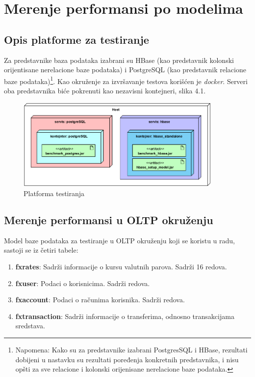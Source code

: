 \documentclass[12pt,oneside]{memoir}
\begin{document}
\chapter{Merenje performansi po modelima}

\section{Opis platforme za testiranje}

Za predstavnike baza podataka izabrani su HBase (kao predstavnik kolonski orijentisane nerelacione baze podataka) i PostgreSQL (kao predstavnik relacione baze podataka)\footnote{Napomena: Kako su za predstavnike izabrani PostgresSQL i HBase, rezultati dobijeni u nastavku su rezultati poređenja konkretnih predstavnika, i nisu opšti za sve relacione i kolonski orijenisane nerelacione baze podataka.}.  Kao okruženje za izvršavanje testova  korišćen je \textit{docker}. Serveri oba predstavnika biće pokrenuti kao nezavisni kontejneri, slika 4.1. 

\begin{figure}[!ht]
  \centering
  \includegraphics[width=0.9\textwidth]{deployment_diagram.png}
  \caption{Platforma testiranja}
  \label{fig:grafikon}
\end{figure}


\section{Merenje performansi u OLTP okruženju}

Model baze podataka za testiranje u OLTP okruženju koji se koristu u radu, sastoji se iz četiri tabele:


\begin{enumerate}
\item[\textbullet] \textbf{fxrates}: {
	Sadrži informacije o kursu valutnih parova. Sadrži 16 redova.
}
\item[\textbullet] \textbf{fxuser}:{
	Podaci o korisnicima. Sadrži   redova.
}
\item[\textbullet] \textbf{fxaccount}:{
	Podaci o računima korisnika. Sadrži   redova.
}
\item[\textbullet] \textbf{fxtransaction}:{
	Sadrži informacije o transferima, odnosno transakcijama sredstava.
}
\end{enumerate}
\end{document}
